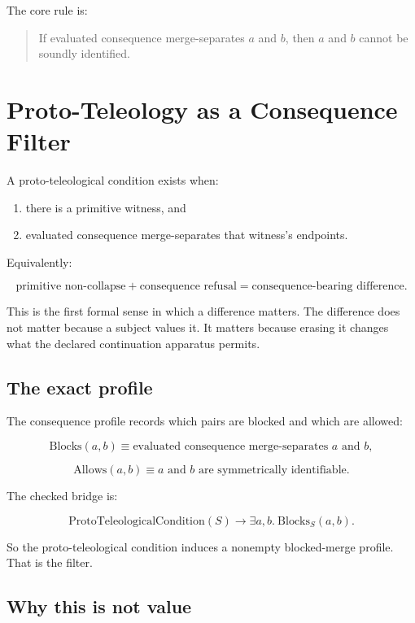 \documentclass[11pt]{article}
\begin{document}
The core rule is:

\begin{quote}
If evaluated consequence merge-separates \(a\) and \(b\), then \(a\) and \(b\)
cannot be soundly identified.
\end{quote}

\section{Proto-Teleology as a Consequence Filter}

A proto-teleological condition exists when:

\begin{enumerate}[leftmargin=*]
  \item there is a primitive witness, and
  \item evaluated consequence merge-separates that witness's endpoints.
\end{enumerate}

Equivalently:

\[
\text{primitive non-collapse}
+
\text{consequence refusal}
=
\text{consequence-bearing difference}.
\]

This is the first formal sense in which a difference matters. The difference
does not matter because a subject values it. It matters because erasing it
changes what the declared continuation apparatus permits.

\subsection{The exact profile}

The consequence profile records which pairs are blocked and which are allowed:

\[
\mathrm{Blocks}(a,b) \equiv
\text{evaluated consequence merge-separates } a \text{ and } b,
\]

\[
\mathrm{Allows}(a,b) \equiv
a \text{ and } b \text{ are symmetrically identifiable}.
\]

The checked bridge is:

\[
\mathrm{ProtoTeleologicalCondition}(S)
\to
\exists a,b.\ \mathrm{Blocks}_S(a,b).
\]

So the proto-teleological condition induces a nonempty blocked-merge profile.
That is the filter.

\subsection{Why this is not value}
\end{document}
